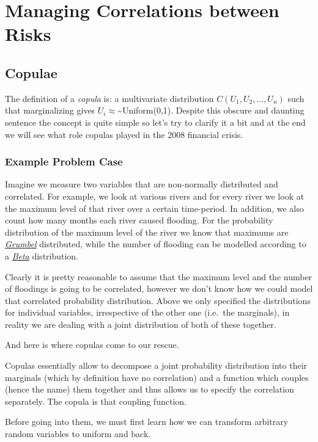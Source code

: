 \chapter{Managing Correlations between Risks}

\section{Copulae}

The definition of a \emph{copula} is: a multivariate distribution
\(C(U_1, U_2, \ldots, U_n)\) such that marginalizing gives
\(U_i \approx\)\textasciitilde{}Uniform(0,1). Despite this obscure and
daunting sentence the concept is quite simple so let's try to clarify it
a bit and at the end we will see what role copulas played in the 2008
financial crisis.

\subsection{Example Problem Case}\label{example-problem-case}

Imagine we measure two variables that are non-normally distributed and
correlated. For example, we look at various rivers and for every river
we look at the maximum level of that river over a certain time-period.
In addition, we also count how many months each river caused flooding.
For the probability distribution of the maximum level of the river we
know that maximums are \href{}{\emph{Grumbel}} distributed, while the
number of flooding can be modelled according to a \href{}{\emph{Beta}}
distribution.

Clearly it is pretty reasonable to assume that the maximum level and the
number of floodings is going to be correlated, however we don't know how
we could model that correlated probability distribution. Above we only
specified the distributions for individual variables, irrespective of
the other one (i.e.~the marginals), in reality we are dealing with a
joint distribution of both of these together.

And here is where copulas come to our rescue.

Copulas essentially allow to decompose a joint probability distribution
into their marginals (which by definition have no correlation) and a
function which couples (hence the name) them together and thus allows us
to specify the correlation separately. The copula is that coupling
function.

Before going into them, we must first learn how we can transform
arbitrary random variables to uniform and back.

